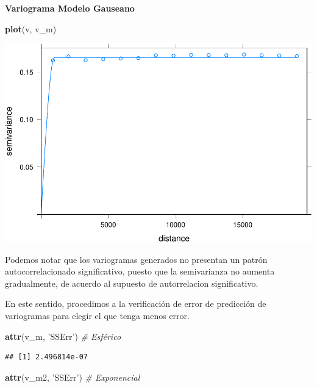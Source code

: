 \documentclass[11pt,]{article}
\newenvironment{Shaded}{\begin{snugshade}}{\end{snugshade}}
\newcommand{\KeywordTok}[1]{\textcolor[rgb]{0.13,0.29,0.53}{\textbf{#1}}}
\newcommand{\StringTok}[1]{\textcolor[rgb]{0.31,0.60,0.02}{#1}}
\newcommand{\CommentTok}[1]{\textcolor[rgb]{0.56,0.35,0.01}{\textit{#1}}}
\newcommand{\NormalTok}[1]{#1}
\begin{document}
\textbf{Variograma Modelo Gauseano}

\begin{Shaded}
\begin{Highlighting}[]
\KeywordTok{plot}\NormalTok{(v, v_m)}
\end{Highlighting}
\end{Shaded}

\includegraphics{proyecto_f_files/figure-latex/unnamed-chunk-51-1.pdf}

Podemos notar que los variogramas generados no presentan un patrón
autocorrelacionado significativo, puesto que la semivarianza no aumenta
gradualmente, de acuerdo al supuesto de autorrelacion significativo.

En este sentido, procedimos a la verificación de error de predicción de
variogramas para elegir el que tenga menos error.

\begin{Shaded}
\begin{Highlighting}[]
\KeywordTok{attr}\NormalTok{(v_m, }\StringTok{'SSErr'}\NormalTok{) }\CommentTok{# Esférico}
\end{Highlighting}
\end{Shaded}

\begin{verbatim}
## [1] 2.496814e-07
\end{verbatim}

\begin{Shaded}
\begin{Highlighting}[]
\KeywordTok{attr}\NormalTok{(v_m2, }\StringTok{'SSErr'}\NormalTok{) }\CommentTok{# Exponencial}
\end{Highlighting}
\end{Shaded}
\end{document}
